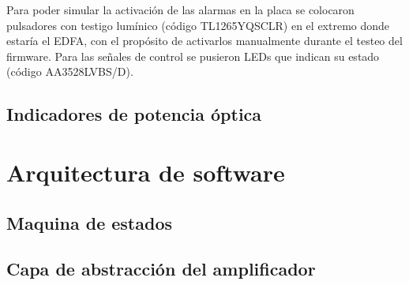 Para poder simular la activación de las alarmas en la placa se colocaron pulsadores con testigo lumínico (código TL1265YQSCLR) en el extremo donde estaría el EDFA, con el propósito de activarlos manualmente durante el testeo del firmware. Para las señales de control se pusieron LEDs que indican su estado (código AA3528LVBS/D).

\subsection{Indicadores de potencia óptica}


\section{Arquitectura de software}

\subsection{Maquina de estados}

\subsection{Capa de abstracción del amplificador}


